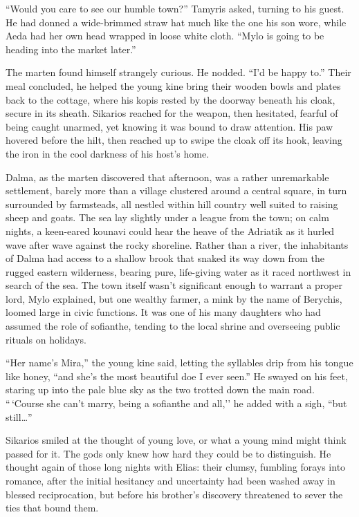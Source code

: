 ``Would you care to see our humble town?'' Tamyris asked, turning to his guest. He had donned a wide-brimmed straw hat much like the one his son wore, while Aeda had her own head wrapped in loose white cloth. ``Mylo is going to be heading into the market later.''

The marten found himself strangely curious. He nodded. ``I'd be happy to.'' Their meal concluded, he helped the young kine bring their wooden bowls and plates back to the cottage, where his kopis rested by the doorway beneath his cloak, secure in its sheath. Sikarios reached for the weapon, then hesitated, fearful of being caught unarmed, yet knowing it was bound to draw attention. His paw hovered before the hilt, then reached up to swipe the cloak off its hook, leaving the iron in the cool darkness of his host's home.

Dalma, as the marten discovered that afternoon, was a rather unremarkable settlement, barely more than a village clustered around a central square, in turn surrounded by farmsteads, all nestled within hill country well suited to raising sheep and goats. The sea lay slightly under a league from the town; on calm nights, a keen-eared kounavi could hear the heave of the Adriatik as it hurled wave after wave against the rocky shoreline. Rather than a river, the inhabitants of Dalma had access to a shallow brook that snaked its way down from the rugged eastern wilderness, bearing pure, life-giving water as it raced northwest in search of the sea. The town itself wasn't significant enough to warrant a proper lord, Mylo explained, but one wealthy farmer, a mink by the name of Berychis, loomed large in civic functions. It was one of his many daughters who had assumed the role of sofianthe, tending to the local shrine and overseeing public rituals on holidays.

``Her name's Mira,'' the young kine said, letting the syllables drip from his tongue like honey, ``and she's the most beautiful doe I ever seen.'' He swayed on his feet, staring up into the pale blue sky as the two trotted down the main road. ``\,`Course she can't marry, being a sofianthe and all,'' he added with a sigh, ``but still\ldots''

Sikarios smiled at the thought of young love, or what a young mind might think passed for it. The gods only knew how hard they could be to distinguish. He thought again of those long nights with Elias: their clumsy, fumbling forays into romance, after the initial hesitancy and uncertainty had been washed away in blessed reciprocation, but before his brother's discovery threatened to sever the ties that bound them.

